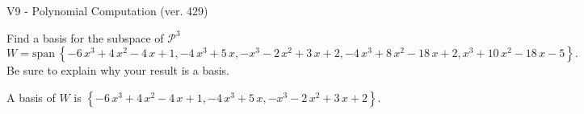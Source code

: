 \begin{exercise}
  \begin{exerciseTitle}V9 - Polynomial Computation (ver. 429)\end{exerciseTitle}
  \begin{exerciseStatement}
    Find a basis for the subspace of \(\mathcal{P}^3\) 
\[W=\mathrm{span}\ \left\{-6 \, x^{3} + 4 \, x^{2} - 4 \, x + 1 , -4 \, x^{3} + 5 \, x , -x^{3} - 2 \, x^{2} + 3 \, x + 2 , -4 \, x^{3} + 8 \, x^{2} - 18 \, x + 2 , x^{3} + 10 \, x^{2} - 18 \, x - 5\right\}.\]
 Be sure to explain why your result is a basis.


  \end{exerciseStatement}
  \begin{exerciseAnswer}
   A basis of \(W\) is  \(\left\{-6 \, x^{3} + 4 \, x^{2} - 4 \, x + 1 , -4 \, x^{3} + 5 \, x , -x^{3} - 2 \, x^{2} + 3 \, x + 2\right\}\).
  


  \end{exerciseAnswer}
\end{exercise}